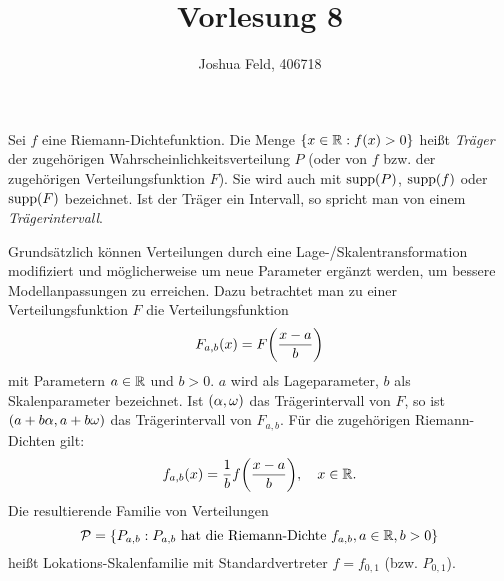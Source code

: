 \documentclass{lecture}
\institute{Institut für Statistik und Wirtschaftsmathematik}
\title{Vorlesung 8}
\author{Joshua Feld, 406718}
\begin{document}
    \maketitle


    \begin{definition}
        Sei \(f\) eine Riemann-Dichtefunktion.
        Die Menge \(\braces*{x \in \R : f\parentheses*{x} > 0}\) heißt \emph{Träger} der zugehörigen Wahrscheinlichkeitsverteilung \(P\) (oder von \(f\) bzw. der zugehörigen Verteilungsfunktion \(F\)).
        Sie wird auch mit \(\supp\parentheses*{P}\), \(\supp\parentheses*{f}\) oder \(\supp\parentheses*{F}\) bezeichnet.
        Ist der Träger ein Intervall, so spricht man von einem \emph{Trägerintervall}.
    \end{definition}

    Grundsätzlich können Verteilungen durch eine Lage-/Skalentransformation modifiziert und möglicherweise um neue Parameter ergänzt werden, um bessere Modellanpassungen zu erreichen.
    Dazu betrachtet man zu einer Verteilungsfunktion \(F\) die Verteilungsfunktion
    \[
        F_{a, b}\parentheses*{x} = F\parentheses*{\frac{x - a}{b}}
    \]
    mit Parametern \(a \in \R\) und \(b > 0\).
    \(a\) wird als Lageparameter, \(b\) als Skalenparameter bezeichnet.
    Ist \(\parentheses*{\alpha, \omega}\) das Trägerintervall von \(F\), so ist \(\parentheses*{a + b\alpha, a + b\omega}\) das Trägerintervall von \(F_{a, b}\).
    Für die zugehörigen Riemann-Dichten gilt:
    \[
        f_{a, b}\parentheses*{x} = \frac{1}{b}f\parentheses*{\frac{x - a}{b}}, \quad x \in \R.
    \]
    Die resultierende Familie von Verteilungen
    \[
        \mathcal{P} = \braces*{P_{a, b} : P_{a, b}\text{ hat die Riemann-Dichte }f_{a, b}, a \in \R, b > 0}
    \]
    heißt Lokations-Skalenfamilie mit Standardvertreter \(f = f_{0, 1}\) (bzw. \(P_{0, 1}\)).
\end{document}
